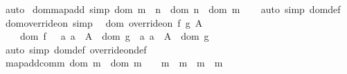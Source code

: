 \begin{isabellebody}
\isamarkupfalse%
\ auto%
\endisatagproof
{\isafoldproof}%
%
\isadelimproof
\isanewline
%
\endisadelimproof
\isanewline
\isanewline
{}\isamarkupfalse%
\ dom{\isacharunderscore}{\kern0pt}map{\isacharunderscore}{\kern0pt}add\ {\isacharbrackleft}{\kern0pt}simp{\isacharbrackright}{\kern0pt}{\isacharcolon}{\kern0pt}\ {\isachardoublequoteopen}dom\ {\isacharparenleft}{\kern0pt}m\ {\isacharplus}{\kern0pt}{\isacharplus}{\kern0pt}\ n{\isacharparenright}{\kern0pt}\ {\isacharequal}{\kern0pt}\ dom\ n\ {\isasymunion}\ dom\ m{\isachardoublequoteclose}\isanewline
%
\isadelimproof
\ \ %
\endisadelimproof
%
\isatagproof
{}\isamarkupfalse%
\ {\isacharparenleft}{\kern0pt}auto\ simp{\isacharcolon}{\kern0pt}\ dom{\isacharunderscore}{\kern0pt}def{\isacharparenright}{\kern0pt}%
\endisatagproof
{\isafoldproof}%
%
\isadelimproof
\isanewline
%
\endisadelimproof
\isanewline
{}\isamarkupfalse%
\ dom{\isacharunderscore}{\kern0pt}override{\isacharunderscore}{\kern0pt}on\ {\isacharbrackleft}{\kern0pt}simp{\isacharbrackright}{\kern0pt}{\isacharcolon}{\kern0pt}\isanewline
\ \ {\isachardoublequoteopen}dom\ {\isacharparenleft}{\kern0pt}override{\isacharunderscore}{\kern0pt}on\ f\ g\ A{\isacharparenright}{\kern0pt}\ {\isacharequal}{\kern0pt}\isanewline
\ \ \ \ {\isacharparenleft}{\kern0pt}dom\ f\ \ {\isacharminus}{\kern0pt}\ {\isacharbraceleft}{\kern0pt}a{\isachardot}{\kern0pt}\ a\ {\isasymin}\ A\ {\isacharminus}{\kern0pt}\ dom\ g{\isacharbraceright}{\kern0pt}{\isacharparenright}{\kern0pt}\ {\isasymunion}\ {\isacharbraceleft}{\kern0pt}a{\isachardot}{\kern0pt}\ a\ {\isasymin}\ A\ {\isasyminter}\ dom\ g{\isacharbraceright}{\kern0pt}{\isachardoublequoteclose}\isanewline
%
\isadelimproof
\ \ %
\endisadelimproof
%
\isatagproof
{}\isamarkupfalse%
\ {\isacharparenleft}{\kern0pt}auto\ simp{\isacharcolon}{\kern0pt}\ dom{\isacharunderscore}{\kern0pt}def\ override{\isacharunderscore}{\kern0pt}on{\isacharunderscore}{\kern0pt}def{\isacharparenright}{\kern0pt}%
\endisatagproof
{\isafoldproof}%
%
\isadelimproof
\isanewline
%
\endisadelimproof
\isanewline
{}\isamarkupfalse%
\ map{\isacharunderscore}{\kern0pt}add{\isacharunderscore}{\kern0pt}comm{\isacharcolon}{\kern0pt}\ {\isachardoublequoteopen}dom\ m{}\ {\isasyminter}\ dom\ m{}\ {\isacharequal}{\kern0pt}\ {\isacharbraceleft}{\kern0pt}{\isacharbraceright}{\kern0pt}\ {\isasymLongrightarrow}\ m{}\ {\isacharplus}{\kern0pt}{\isacharplus}{\kern0pt}\ m{}\ {\isacharequal}{\kern0pt}\ m{}\ {\isacharplus}{\kern0pt}{\isacharplus}{\kern0pt}\ m{}{\isachardoublequoteclose}\isanewline

\end{isabellebody}
